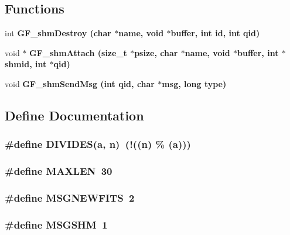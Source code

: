 \subsection*{Functions}
\begin{CompactItemize}
\item 
int \bf{GF\_\-shm\-Destroy} (char $\ast$name, void $\ast$buffer, int id, int qid)
\item 
void $\ast$ \bf{GF\_\-shm\-Attach} (size\_\-t $\ast$psize, char $\ast$name, void $\ast$buffer, int $\ast$\bf{shmid}, int $\ast$qid)
\item 
void \bf{GF\_\-shm\-Send\-Msg} (int qid, char $\ast$msg, long type)
\end{CompactItemize}


\subsection{Define Documentation}
\subsubsection{\setlength{\rightskip}{0pt plus 5cm}\#define DIVIDES(a, n)~(!((n) \% (a)))}\label{GF__shmem_8h_6c9de7e7b7ad3939e52f63063a601820}


\subsubsection{\setlength{\rightskip}{0pt plus 5cm}\#define MAXLEN~30}\label{GF__shmem_8h_e6648cd71a8bd49d58ae8ed33ba910d1}


\subsubsection{\setlength{\rightskip}{0pt plus 5cm}\#define MSGNEWFITS~2}\label{GF__shmem_8h_08348d01b3494d1ddc88e5a3b80c19da}


\subsubsection{\setlength{\rightskip}{0pt plus 5cm}\#define MSGSHM~1}\label{GF__shmem_8h_daf6ed606a67f73d0696e9bbfc2467f2}


